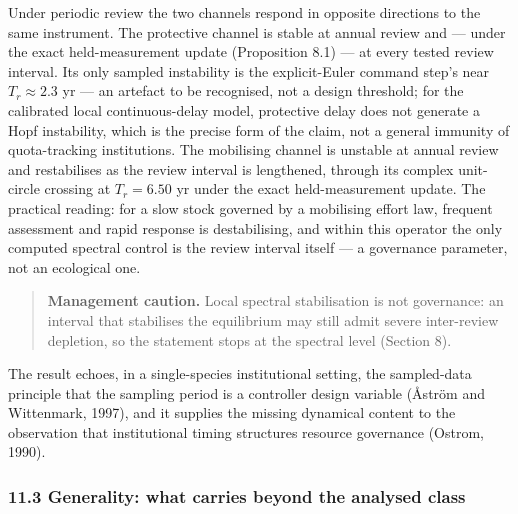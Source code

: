 \documentclass[11pt]{article}
\begin{document}
Under periodic review the two channels respond in opposite directions to
the same instrument. The protective channel is stable at annual review
and --- under the exact held-measurement update (Proposition 8.1) --- at
every tested review interval. Its only sampled instability is the
explicit-Euler command step's near \(T_r \approx 2.3\) yr --- an
artefact to be recognised, not a design threshold; for the calibrated
local continuous-delay model, protective delay does not generate a Hopf
instability, which is the precise form of the claim, not a general
immunity of quota-tracking institutions. The mobilising channel is
unstable at annual review and restabilises as the review interval is
lengthened, through its complex unit-circle crossing at \(T_r = 6.50\)
yr under the exact held-measurement update. The practical reading: for a
slow stock governed by a mobilising effort law, frequent assessment and
rapid response is destabilising, and within this operator the only
computed spectral control is the review interval itself --- a governance
parameter, not an ecological one.

\begin{quote}
\textbf{Management caution.} Local spectral stabilisation is not
governance: an interval that stabilises the equilibrium may still admit
severe inter-review depletion, so the statement stops at the spectral
level (Section 8).
\end{quote}

The result echoes, in a single-species institutional setting, the
sampled-data principle that the sampling period is a controller design
variable (\AA{}str\"om and Wittenmark, 1997), and it supplies the missing
dynamical content to the observation that institutional timing
structures resource governance (Ostrom, 1990).

\subsubsection{11.3 Generality: what carries beyond the analysed
class}\label{generality-what-carries-beyond-the-analysed-class}
\end{document}
